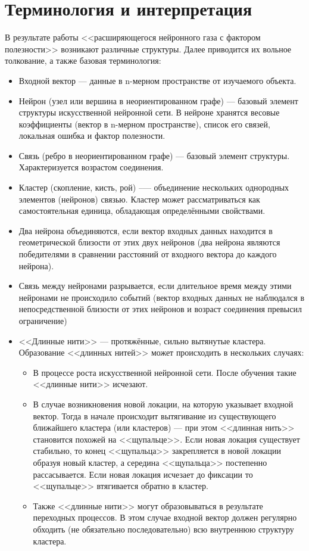 \documentclass[unicode, 12pt, a4paper,oneside,fleqn]{article}
\begin{document}
\section{Терминология и интерпретация}
В результате работы <<расширяющегося нейронного газа с фактором
полезности>> возникают различные структуры. Далее приводится их
вольное толкование, а также базовая терминология:

\begin{itemize}
\item Входной вектор --- данные в n-мерном пространстве от изучаемого
  объекта.
\item Нейрон (узел или вершина в неориентированном графе) --- базовый
  элемент структуры искусственной нейронной сети. В нейроне хранятся
  весовые коэффициенты (вектор в n-мерном пространстве), список его
  связей, локальная ошибка и фактор полезности.
\item Связь (ребро в неориентированном графе) --- базовый элемент
  структуры. Характеризуется возрастом соединения.
\item Кластер (скопление, кисть, рой) --— объединение нескольких
  однородных элементов (нейронов) связью. Кластер может рассматриваться как
  самостоятельная единица, обладающая определёнными свойствами.
\item Два нейрона объединяются, если вектор входных данных находится в
  геометрической близости от этих двух нейронов (два нейрона являются
  победителями в сравнении расстояний от входного вектора до каждого
  нейрона).
\item Связь между нейронами разрывается, если длительное время между
  этими нейронами не происходило событий (вектор входных данных не
  наблюдался в непосредственной близости от этих нейронов и возраст
  соединения превысил ограничение)
\item <<Длинные нити>> --- протяжённые, сильно вытянутые кластера.
  Образование <<длинных нитей>> может происходить в нескольких случаях:
  \begin{itemize}
  \item В процессе роста искусственной нейронной сети. После обучения
    такие <<длинные нити>> исчезают.
  \item В случае возникновения новой локации, на которую указывает
    входной вектор. Тогда в начале происходит вытягивание из
    существующего ближайшего кластера (или кластеров) --- при этом
    <<длинная нить>> становится похожей на <<щупальце>>. Если новая
    локация существует стабильно, то конец <<щупальца>> закрепляется в
    новой локации образуя новый кластер, а середина <<щупальца>>
    постепенно рассасывается. Если новая локация исчезает до фиксации
    то <<щупальце>> втягивается обратно в кластер.
  \item Также <<длинные нити>> могут образовываться в результате
    переходных процессов. В этом случае входной вектор должен
    регулярно обходить (не обязательно последовательно) всю внутреннюю
    структуру кластера.
  \end{itemize}
\end{itemize}
\end{document}
